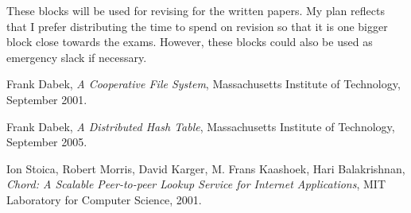\documentclass[12pt]{article}
\begin{document}
These blocks will be used for revising for the written papers. My plan reflects that I prefer distributing the time to spend on revision so that it is one bigger block close towards the exams. However, these blocks could also be used as emergency slack if necessary.

\clearpage
\begin{thebibliography}{9}

  Frank Dabek,
  \emph{A Cooperative File System},
  Massachusetts Institute of Technology,
  September 2001.

  Frank Dabek,
  \emph{A Distributed Hash Table},
  Massachusetts Institute of Technology,
  September 2005.

  Ion Stoica, Robert Morris, David Karger, M. Frans Kaashoek, Hari Balakrishnan,
  \emph{Chord: A Scalable Peer-to-peer Lookup Service for Internet Applications},
  MIT Laboratory for Computer Science,
  2001.

\end{thebibliography}
\end{document}
